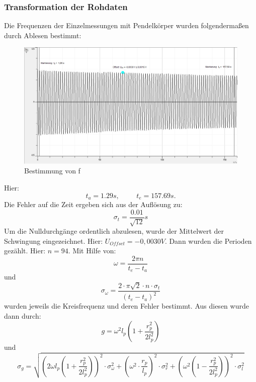 \documentclass[12pt,a4paper]{article}
\begin{document}
\subsubsection{Transformation der Rohdaten}
Die Frequenzen der  Einzelmessungen mit Pendelkörper wurden folgendermaßen durch Ablesen bestimmt:
\begin{figure}[H]
\caption{Bestimmung von f}
\centering
\includegraphics[scale=0.5]{Bilder/Erdbeschleunigung_bestimmungF.png}
\end{figure}
Hier:
\begin{equation}
t_a=1.29s, \hspace{1cm} t_e=157.69s.
\end{equation}
Die Fehler auf die Zeit ergeben sich aus der Auflösung zu:
\begin{equation}
\sigma_t=\frac{0.01}{\sqrt{12}}s
\end{equation}
Um die Nulldurchgänge ordentlich abzulesen, wurde der Mittelwert der Schwingung eingezeichnet. Hier: $U_{Offset} = -0,0030 V$.
Dann wurden die Perioden gezählt. Hier: $n=94$.
Mit Hilfe von:
\begin{equation}
\omega=\frac{2\pi n}{t_e-t_a}
\end{equation}
und
\begin{equation}
\sigma_{\omega}=\frac{2\cdot \pi \sqrt{2}\cdot n \cdot \sigma_t}{(t_e-t_a)^2}
\end{equation}
wurden jeweils die Kreisfrequenz und deren Fehler bestimmt.
Aus diesen wurde dann durch:
\begin{equation}
g=\omega^2 l_p (1+\frac{r_p^2}{2 l_p^2}) 
\end{equation}
und
\begin{equation}
\sigma_g=\sqrt{(2\omega l_p (1+\frac{r_p^2}{2 l_p^2}))^2 \cdot \sigma_{\omega}^2+(\omega^2 \cdot \frac{r_p}{l_p})^2 \cdot \sigma_r^2+(\omega^2(1-\frac{r_p^2}{2 l_p^2}))^2 \cdot \sigma_l^2} 
\end{equation}
\end{document}
